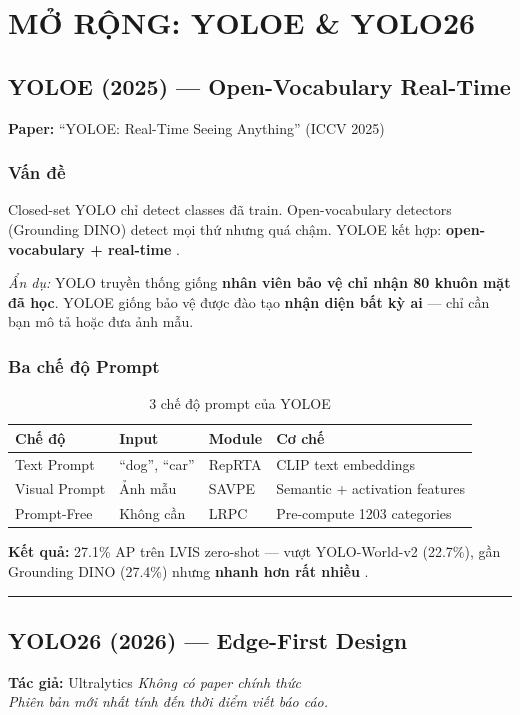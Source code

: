 \chapter{MỞ RỘNG: YOLOE \& YOLO26}

\section{YOLOE (2025) --- Open-Vocabulary Real-Time}
\textbf{Paper:} ``YOLOE: Real-Time Seeing Anything'' (ICCV 2025) \cite{yoloe}

\subsection{Vấn đề}
Closed-set YOLO chỉ detect classes đã train. Open-vocabulary detectors (Grounding DINO) detect mọi thứ nhưng quá chậm. YOLOE kết hợp: \textbf{open-vocabulary + real-time} \cite{yoloe}.

\textit{Ẩn dụ:} YOLO truyền thống giống \textbf{nhân viên bảo vệ chỉ nhận 80 khuôn mặt đã học}. YOLOE giống bảo vệ được đào tạo \textbf{nhận diện bất kỳ ai} --- chỉ cần bạn mô tả hoặc đưa ảnh mẫu.

\subsection{Ba chế độ Prompt}
\begin{table}[H]\centering
\caption{3 chế độ prompt của YOLOE}
\begin{tabular}{llll}\toprule
\textbf{Chế độ} & \textbf{Input} & \textbf{Module} & \textbf{Cơ chế}\\\midrule
Text Prompt & ``dog'', ``car'' & RepRTA & CLIP text embeddings \\
Visual Prompt & Ảnh mẫu & SAVPE & Semantic + activation features \\
Prompt-Free & Không cần & LRPC & Pre-compute 1203 categories \\\bottomrule
\end{tabular}
\end{table}

\textbf{Kết quả:} 27.1\% AP trên LVIS zero-shot --- vượt YOLO-World-v2 (22.7\%), gần Grounding DINO (27.4\%) nhưng \textbf{nhanh hơn rất nhiều} \cite{yoloe}\cite{yoloworld}.

\noindent\rule{\textwidth}{0.4pt}

\section{YOLO26 (2026) --- Edge-First Design}
\textbf{Tác giả:} Ultralytics \hfill \textit{Không có paper chính thức} \cite{yolo26}\\
\textit{Phiên bản mới nhất tính đến thời điểm viết báo cáo.}

